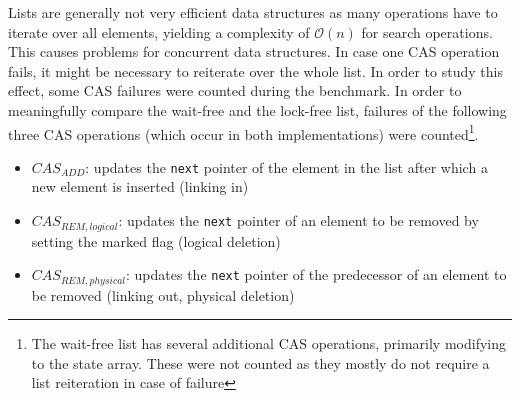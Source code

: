 \documentclass[a4paper, 12pt]{article}
\begin{document}
Lists are generally not very efficient data structures as many operations have to iterate over all elements, yielding a complexity of $\mathcal{O}(n)$ for search operations. This causes problems for concurrent data structures. In case one CAS operation fails, it might be necessary to reiterate over the whole list. In order to study this effect, some CAS failures were counted during the benchmark. In order to meaningfully compare the wait-free and the lock-free list, failures of the following three CAS operations (which occur in both implementations) were counted\footnote{The wait-free list has several additional CAS operations, primarily modifying to the state array. These were not counted as they mostly do not require a list reiteration in case of failure}.
\begin{itemize}
\setlength\itemsep{0em}
\item{$CAS_{ADD}$: updates the \verb|next| pointer of the element in the list after which a new element is inserted (linking in)}
\item{$CAS_{REM, logical}$: updates the \verb|next| pointer of an element to be removed by setting the marked flag (logical deletion)}
\item{$CAS_{REM, physical}$: updates the \verb|next| pointer of the predecessor of an element to be removed (linking out, physical deletion)}
\end{itemize}
\end{document}
